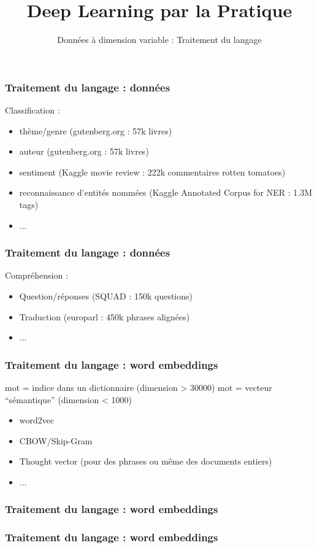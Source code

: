 \documentclass{formation}
\title{Deep Learning par la Pratique}
\subtitle{Données à dimension variable : Traitement du langage}
\begin{document}
\maketitle

\begin{frame}
  \frametitle{Traitement du langage : données}
  Classification :
  \begin{itemize}
  \item thème/genre (gutenberg.org : 57k livres)
  \item auteur (gutenberg.org : 57k livres)
  \item sentiment (Kaggle movie review : 222k commentaires rotten tomatoes)
  \item reconnaissance d'entités nommées (Kaggle Annotated Corpus for NER : 1.3M tags)
  \item ...
  \end{itemize}
\end{frame}

\begin{frame}
  \frametitle{Traitement du langage : données}
  Compréhension :
  \begin{itemize}
  \item Question/réponses (SQUAD : 150k questions)
  \item Traduction (europarl : 450k phrases alignées)
  \item ...
  \end{itemize}
\end{frame}

\begin{frame}
  \frametitle{Traitement du langage : word embeddings} 
  mot = indice dans un dictionnaire (dimension > 30000)
  \newline
  mot = vecteur ``sémantique'' (dimension < 1000) 
  \begin{itemize}
  \item word2vec
  \item CBOW/Skip-Gram
  \item Thought vector (pour des phrases ou même des documents entiers)
  \item ...
  \end{itemize}
\end{frame}

\begin{frame}
  \frametitle{Traitement du langage : word embeddings} 
\end{frame}

\begin{frame}
  \frametitle{Traitement du langage : word embeddings} 
  \begin{center}
    \href{https://ml5js.org/reference/api-Word2vec/}{} \\
    \href{https://projector.tensorflow.org/}{}
  \end{center}
\end{frame}
\end{document}
